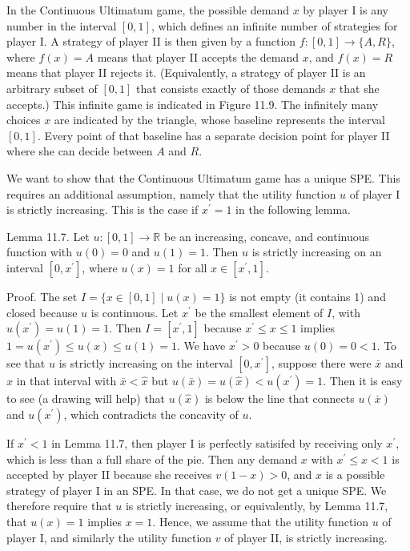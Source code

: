 \documentclass[12pt]{article}
\begin{document}
In the Continuous Ultimatum game, the possible demand $x$ by player I is any number in the interval $[0,1]$, which defines an infinite number of strategies for player I. A strategy of player II is then given by a function $f:[0,1] \rightarrow\{A, R\}$, where $f(x)=A$ means that player II accepts the demand $x$, and $f(x)=R$ means that player II rejects it. (Equivalently, a strategy of player II is an arbitrary subset of $[0,1]$ that consists exactly of those demands $x$ that she accepts.) This infinite game is indicated in Figure 11.9. The infinitely many choices $x$ are indicated by the triangle, whose baseline represents the interval $[0,1]$. Every point of that baseline has a separate decision point for player II where she can decide between $A$ and $R$.

We want to show that the Continuous Ultimatum game has a unique SPE. This requires an additional assumption, namely that the utility function $u$ of player I is strictly increasing. This is the case if $x^{\prime}=1$ in the following lemma.

Lemma 11.7. Let $u:[0,1] \rightarrow \mathbb{R}$ be an increasing, concave, and continuous function with $u(0)=0$ and $u(1)=1$. Then $u$ is strictly increasing on an interval $\left[0, x^{\prime}\right]$, where $u(x)=1$ for all $x \in\left[x^{\prime}, 1\right]$.

Proof. The set $I=\{x \in[0,1] \mid u(x)=1\}$ is not empty (it contains 1) and closed because $u$ is continuous. Let $x^{\prime}$ be the smallest element of $I$, with $u\left(x^{\prime}\right)=u(1)=1$. Then $I=\left[x^{\prime}, 1\right]$ because $x^{\prime} \leq x \leq 1$ implies $1=u\left(x^{\prime}\right) \leq u(x) \leq u(1)=1$. We have $x^{\prime}>0$ because $u(0)=0<1$. To see that $u$ is strictly increasing on the interval $\left[0, x^{\prime}\right]$, suppose there were $\bar{x}$ and $\hat{x}$ in that interval with $\bar{x}<\hat{x}$ but $u(\bar{x})=u(\hat{x})<u\left(x^{\prime}\right)=1$. Then it is easy to see (a drawing will help) that $u(\hat{x})$ is below the line that connects $u(\bar{x})$ and $u\left(x^{\prime}\right)$, which contradicts the concavity of $u$.

If $x^{\prime}<1$ in Lemma 11.7, then player I is perfectly satisifed by receiving only $x^{\prime}$, which is less than a full share of the pie. Then any demand $x$ with $x^{\prime} \leq x<1$ is accepted by player II because she receives $v(1-x)>0$, and $x$ is a possible strategy of player I in an SPE. In that case, we do not get a unique SPE. We therefore require that $u$ is strictly increasing, or equivalently, by Lemma 11.7, that $u(x)=1$ implies $x=1$. Hence, we assume that the utility function $u$ of player I, and similarly the utility function $v$ of player II, is strictly increasing.
\end{document}
